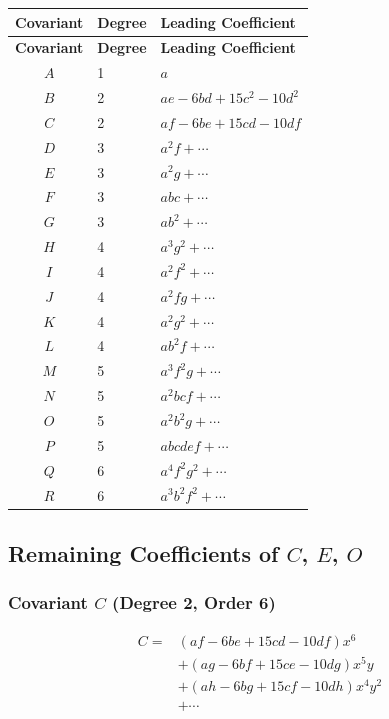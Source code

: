\documentclass[11pt,a4paper]{article}
\theoremstyle{definition}
\begin{document}
\begin{center}
\small
\begin{longtable}{|c|l|l|}
\hline
\textbf{Covariant} & \textbf{Degree} & \textbf{Leading Coefficient} \\
\hline
\endfirsthead
\hline
\textbf{Covariant} & \textbf{Degree} & \textbf{Leading Coefficient} \\
\hline
\endhead
\hline
\endfoot
$A$ & 1 & $a$ \\
$B$ & 2 & $ae - 6bd + 15c^2 - 10d^2$ \\
$C$ & 2 & $af - 6be + 15cd - 10df$ \\
$D$ & 3 & $a^2f + \dotsb$ \\
$E$ & 3 & $a^2g + \dotsb$ \\
$F$ & 3 & $abc + \dotsb$ \\
$G$ & 3 & $ab^2 + \dotsb$ \\
$H$ & 4 & $a^3g^2 + \dotsb$ \\
$I$ & 4 & $a^2f^2 + \dotsb$ \\
$J$ & 4 & $a^2fg + \dotsb$ \\
$K$ & 4 & $a^2g^2 + \dotsb$ \\
$L$ & 4 & $ab^2f + \dotsb$ \\
$M$ & 5 & $a^3f^2g + \dotsb$ \\
$N$ & 5 & $a^2bcf + \dotsb$ \\
$O$ & 5 & $a^2b^2g + \dotsb$ \\
$P$ & 5 & $abcdef + \dotsb$ \\
$Q$ & 6 & $a^4f^2g^2 + \dotsb$ \\
$R$ & 6 & $a^3b^2f^2 + \dotsb$ \\
\hline
\end{longtable}
\end{center}

\subsection*{Remaining Coefficients of $C$, $E$, $O$}

\subsubsection*{Covariant $C$ (Degree 2, Order 6)}

\[
\begin{aligned}
C ={}& (af - 6be + 15cd - 10df)x^6 \\
& + (ag - 6bf + 15ce - 10dg)x^5y \\
& + (ah - 6bg + 15cf - 10dh)x^4y^2 \\
& + \dotsb
\end{aligned}
\]
\end{document}
